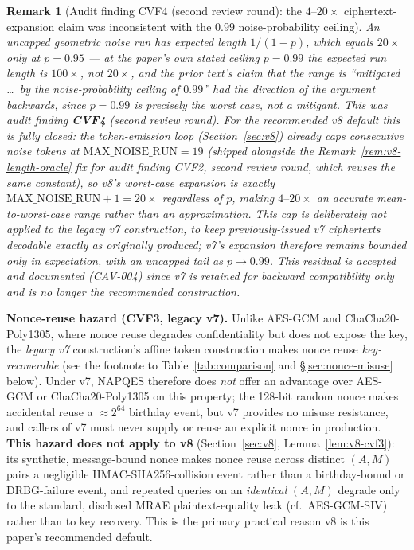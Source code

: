 \documentclass[11pt,a4paper]{article}
\newtheorem{remark}[theorem]{Remark}
\begin{document}
\begin{remark}[Audit finding CVF4 (second review round): the $4$--$20\times$ ciphertext-expansion claim was inconsistent with the $0.99$ noise-probability ceiling]
\label{rem:v2cvf4}
An uncapped geometric noise run has expected length $1/(1-p)$, which
equals $20\times$ only at $p=0.95$ --- at the paper's own stated ceiling
$p=0.99$ the expected run length is $100\times$, not $20\times$, and the
prior text's claim that the range is ``mitigated \ldots\ by the
noise-probability ceiling of $0.99$'' had the direction of the argument
backwards, since $p=0.99$ is precisely the worst case, not a mitigant.
This was audit finding \textbf{CVF4} (second review round). For the
recommended v8 default this is fully closed: the token-emission loop
(Section~\ref{sec:v8}) already caps consecutive noise tokens at
$\mathrm{MAX\_NOISE\_RUN}=19$ (shipped alongside the
Remark~\ref{rem:v8-length-oracle} fix for audit finding CVF2, second
review round, which reuses the same constant), so v8's worst-case
expansion is \emph{exactly} $\mathrm{MAX\_NOISE\_RUN}+1=20\times$
regardless of $p$, making $4\text{--}20\times$ an accurate
mean-to-worst-case range rather than an approximation. This cap is
deliberately not applied to the legacy v7 construction, to keep
previously-issued v7 ciphertexts decodable exactly as originally
produced; v7's expansion therefore remains bounded only in expectation,
with an uncapped tail as $p\to0.99$. This residual is accepted and
documented (CAV-004) since v7 is retained for backward compatibility only
and is no longer the recommended construction.
\end{remark}

\textbf{Nonce-reuse hazard (CVF3, legacy v7).}  Unlike AES-GCM and
ChaCha20-Poly1305, where nonce reuse degrades confidentiality but does not
expose the key, the \emph{legacy v7} construction's affine token
construction makes nonce reuse \emph{key-recoverable} (see the footnote to
Table~\ref{tab:comparison} and \S\ref{sec:nonce-misuse} below). Under v7,
NAPQES therefore does \emph{not} offer an advantage over AES-GCM or
ChaCha20-Poly1305 on this property; the 128-bit random nonce makes
accidental reuse a $\approx 2^{64}$ birthday event, but v7 provides no
misuse resistance, and callers of v7 must never supply or reuse an
explicit nonce in production. \textbf{This hazard does not apply to v8}
(Section~\ref{sec:v8}, Lemma~\ref{lem:v8-cvf3}): its synthetic,
message-bound nonce makes nonce reuse across distinct $(A,M)$ pairs a
negligible HMAC-SHA256-collision event rather than a birthday-bound or
DRBG-failure event, and repeated queries on an \emph{identical} $(A,M)$
degrade only to the standard, disclosed MRAE plaintext-equality leak (cf.\
AES-GCM-SIV) rather than to key recovery. This is the primary practical
reason v8 is this paper's recommended default.
\end{document}
